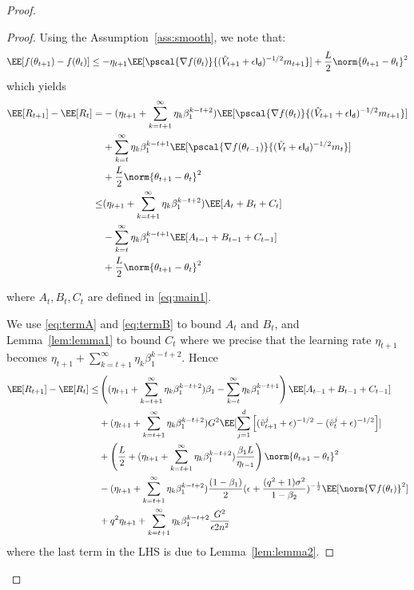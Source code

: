 \documentclass[11pt]{article}
\begin{document}
\begin{proof}
\begin{proof}
Using the Assumption~\ref{ass:smooth}, we note that:
\begin{equation}
\begin{split}
\EE[f(\theta_{t+1}) - f(\theta_{t}) ] \leq - \eta_{t+1} \EE[\pscal{\nabla f(\theta_{t})}{(\hat{V}_{t+1} + \epsilon \mathsf{I_d})^{-1/2} m_{t+1}}] +\frac{L}{2}  \norm{\theta_{t+1} - \theta_{t}}^2
\end{split}
\end{equation}
which yields
\begin{equation}
\begin{split}
\EE[R_{t+1}] - \EE[R_t] =& - (\eta_{t+1} + \sum_{k=t+1}^\infty \eta_{k} \beta_1^{k-t+2})\EE[\pscal{\nabla f(\theta_{t})}{(\hat{V}_{t+1} + \epsilon \mathsf{I_d})^{-1/2} m_{t+1}}] \\
& +  \sum_{k=t}^\infty \eta_{k} \beta_1^{k-t+1}\EE[\pscal{\nabla f(\theta_{t-1})}{(\hat{V}_{t} + \epsilon \mathsf{I_d})^{-1/2} m_{t}}]\\
& +\frac{L}{2}  \norm{\theta_{t+1} - \theta_{t}}^2\\
\leq&  (\eta_{t+1} + \sum_{k=t+1}^\infty \eta_{k} \beta_1^{k-t+2})\EE[A_t + B_t + C_t] \\
& -  \sum_{k=t}^\infty \eta_{k} \beta_1^{k-t+1}\EE[A_{t-1} + B_{t-1} + C_{t-1}]\\
& +\frac{L}{2}  \norm{\theta_{t+1} - \theta_{t}}^2
\end{split}
\end{equation}

where $A_t, B_t, C_t$ are defined in \eqref{eq:main1}.

We use \eqref{eq:termA} and \eqref{eq:termB} to bound $A_t$ and $B_t$, and Lemma~\ref{lem:lemma1} to bound $C_t$ where we precise that the learning rate $\eta_{t+1}$ becomes $ \eta_{t+1}+ \sum_{k=t+1}^\infty \eta_{k} \beta_1^{k-t+2}$.
Hence
\begin{equation}\label{eq:mainR}
\begin{split}
\EE[R_{t+1}] - \EE[R_t] \leq &
  \left( (\eta_{t+1} + \sum_{k=t+1}^\infty \eta_{k} \beta_1^{k-t+2}) \beta_1- \sum_{k=t}^\infty \eta_{k} \beta_1^{k-t+1}\right) \EE[A_{t-1} + B_{t-1} + C_{t-1}]\\
&  +  (\eta_{t+1}+ \sum_{k=t+1}^\infty \eta_{k} \beta_1^{k-t+2}) G^2 \EE[\sum_{j=1}^d \left[(\hat{v}^j_{t+1} + \epsilon )^{-1/2} - (\hat{v}^j_{t} + \epsilon )^{-1/2}  \right] ]\\
& + \left(\frac{L}{2} + (\eta_{t+1}+ \sum_{k=t+1}^\infty \eta_{k} \beta_1^{k-t+2})\frac{\beta_1 L}{\eta_{t-1}} \right)   \norm{\theta_{t+1} - \theta_{t}}^2\\
& - (\eta_{t+1}+ \sum_{k=t+1}^\infty \eta_{k} \beta_1^{k-t+2})\frac{(1-\beta_1)}{2}  (\epsilon + \frac{(q^2+1)\sigma^2}{1 - \beta_2})^{-\frac{1}{2}} \EE[\norm{\nabla f(\theta_t)}^2] \\
& +q^2 \eta_{t+1}+ \sum_{k=t+1}^\infty \eta_{k} \beta_1^{k-t+2}\frac{G^2 }{\epsilon 2n^2}
\end{split}
\end{equation}
where the last term in the LHS is due to Lemma~\ref{lem:lemma2}.


\end{proof}
\end{proof}
\end{document}
